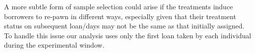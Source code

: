 \documentclass[oneside,11pt]{article}
\begin{document}


A more subtle form of sample selection could arise if the treatments induce borrowers to re-pawn in different ways, especially given that their treatment status on subsequent loan/days may not be the same as that initially assigned.  To handle this issue our analysis uses only the first loan taken by each individual during the experimental window.  

   
\end{document}

